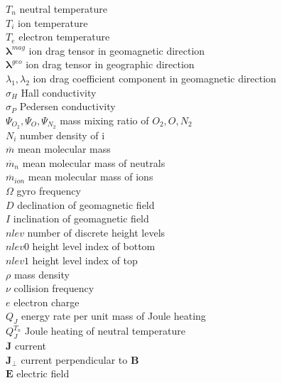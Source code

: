 \begin{tabbing}
\>$T_n$             \> neutral temperature    \\
\>$T_i$             \> ion temperature    \\
\>$T_e$             \> electron temperature    \\
\>$\mathbf{\lambda}^{mag}$         \> ion drag tensor in geomagnetic direction    \\
\>$\mathbf{\lambda}^{geo}$         \> ion drag tensor in geographic direction    \\
\>$\lambda_1, \lambda_2$ \> ion drag coefficient component in geomagnetic direction    \\
\>$\sigma_H$        \> Hall conductivity    \\
\>$\sigma_P$        \> Pedersen conductivity    \\
\>$\Psi_{O_2}, \Psi_O, \Psi_{N_2}$     \> mass mixing ratio of $O_2, O, N_2$    \\
\>$N_{i}$           \> number density of i    \\
\>$\overline{m}$    \> mean molecular mass    \\
\>$\overline{m}_n$    \> mean molecular mass of neutrals   \\
\>$\overline{m}_{ion}$    \> mean molecular mass of ions   \\
\>$\Omega$          \> gyro frequency    \\
\>$D$               \> declination of geomagnetic field    \\
\>$I$               \> inclination of geomagnetic field    \\
\>$nlev$            \> number of discrete height levels    \\
\>$nlev0$            \> height level index of bottom   \\
\>$nlev1$            \> height level index of top    \\
\>$\rho$            \> mass density    \\
\>$\nu$             \> collision frequency    \\
\>$e$               \> electron charge    \\
\>$Q_J$             \> energy rate per unit mass of Joule heating    \\
\>$Q_J^{T_n}$             \> Joule heating of neutral temperature   \\
\>$\textbf{J}$      \> current    \\
\>$\textbf{J}_{\bot}$\> current perpendicular to  $\textbf{B}$   \\
\>$\textbf{E}$      \> electric field   \\

\end{tabbing}
